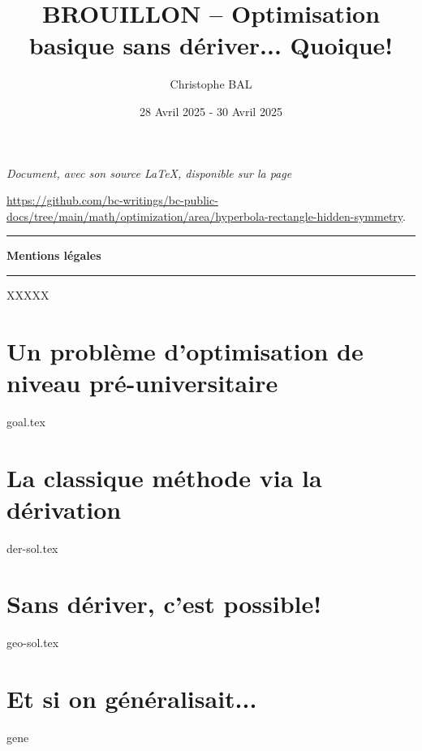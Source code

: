 \documentclass[12pt]{amsart}
\begin{document}
\title{BROUILLON -- Optimisation basique sans dériver... Quoique!}
\author{Christophe BAL}
\date{28 Avril 2025 - 30 Avril 2025}

\maketitle

\begin{center}
	\itshape
	Document, avec son source \LaTeX, disponible sur la page

	\url{https://github.com/bc-writings/bc-public-docs/tree/main/math/optimization/area/hyperbola-rectangle-hidden-symmetry}.
\end{center}


\bigskip


\begin{center}
	\hrule\vspace{.3em}
	{
		\fontsize{1.35em}{1em}\selectfont
		\textbf{Mentions \og légales \fg}
	}

	\vspace{0.45em}
	\doclicenseThis
	\hrule
\end{center}


\bigskip


\setcounter{tocdepth}{2}
\tableofcontents




\newpage

\begin{meta-abstract*}
	XXXXX
\end{meta-abstract*}




\section{Un problème d'optimisation de niveau pré-universitaire}

{goal.tex}





\section{La classique méthode via la dérivation}

{der-sol.tex}




\section{Sans dériver, c'est possible!}

{geo-sol.tex}




\section{Et si on généralisait...}

{gene}
	
\end{document}
